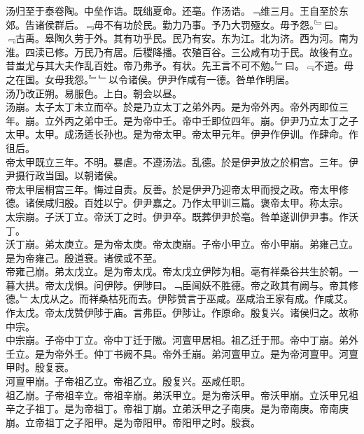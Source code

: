 \documentclass{zhvt-classic}
\begin{document}
\hspace*{2em}汤归至于泰卷陶。中垒作诰。既绌夏命。还亳。作汤诰。﹁维三月。王自至於东郊。告诸侯群后。﹃毋不有功於民。勤力乃事。予乃大罚殛女。毋予怨。﹄曰。﹃古禹。皋陶久劳于外。其有功乎民。民乃有安。东为江。北为济。西为河。南为淮。四渎已修。万民乃有居。后稷降播。农殖百谷。三公咸有功于民。故後有立。昔蚩尤与其大夫作乱百姓。帝乃弗予。有状。先王言不可不勉。﹄曰。﹃不道。毋之在国。女毋我怨。﹄﹂以令诸侯。伊尹作咸有一德。咎单作明居。\\
\hspace*{2em}汤乃改正朔。易服色。上白。朝会以昼。\\
\hspace*{2em}汤崩。太子太丁未立而卒。於是乃立太丁之弟外丙。是为帝外丙。帝外丙即位三年。崩。立外丙之弟中壬。是为帝中壬。帝中壬即位四年。崩。伊尹乃立太丁之子太甲。太甲。成汤适长孙也。是为帝太甲。帝太甲元年。伊尹作伊训。作肆命。作徂后。\\
\hspace*{2em}帝太甲既立三年。不明。暴虐。不遵汤法。乱德。於是伊尹放之於桐宫。三年。伊尹摄行政当国。以朝诸侯。\\
\hspace*{2em}帝太甲居桐宫三年。悔过自责。反善。於是伊尹乃迎帝太甲而授之政。帝太甲修德。诸侯咸归殷。百姓以宁。伊尹嘉之。乃作太甲训三篇。褒帝太甲。称太宗。\\
\hspace*{2em}太宗崩。子沃丁立。帝沃丁之时。伊尹卒。既葬伊尹於亳。咎单遂训伊尹事。作沃丁。\\
\hspace*{2em}沃丁崩。弟太庚立。是为帝太庚。帝太庚崩。子帝小甲立。帝小甲崩。弟雍己立。是为帝雍己。殷道衰。诸侯或不至。\\
\hspace*{2em}帝雍己崩。弟太戊立。是为帝太戊。帝太戊立伊陟为相。亳有祥桑谷共生於朝。一暮大拱。帝太戊惧。问伊陟。伊陟曰。﹁臣闻妖不胜德。帝之政其有阙与。帝其修德。﹂太戊从之。而祥桑枯死而去。伊陟赞言于巫咸。巫咸治王家有成。作咸艾。作太戊。帝太戊赞伊陟于庙。言弗臣。伊陟让。作原命。殷复兴。诸侯归之。故称中宗。\\
\hspace*{2em}中宗崩。子帝中丁立。帝中丁迁于隞。河亶甲居相。祖乙迁于邢。帝中丁崩。弟外壬立。是为帝外壬。仲丁书阙不具。帝外壬崩。弟河亶甲立。是为帝河亶甲。河亶甲时。殷复衰。\\
\hspace*{2em}河亶甲崩。子帝祖乙立。帝祖乙立。殷复兴。巫咸任职。\\
\hspace*{2em}祖乙崩。子帝祖辛立。帝祖辛崩。弟沃甲立。是为帝沃甲。帝沃甲崩。立沃甲兄祖辛之子祖丁。是为帝祖丁。帝祖丁崩。立弟沃甲之子南庚。是为帝南庚。帝南庚崩。立帝祖丁之子阳甲。是为帝阳甲。帝阳甲之时。殷衰。\\
\end{document}
